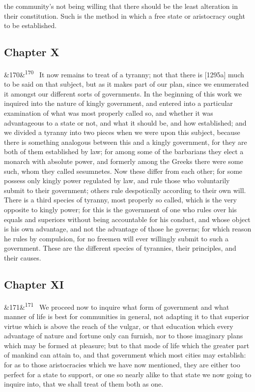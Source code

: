 \documentclass[12pt]{article}
\newcommand{\para}[1][]{\par\noindent\ifx&#1&\else\textsuperscript{\footnotesize #1}~\fi}
\begin{document}
the community's not being willing that there should be the least alteration in their constitution. Such is the method in which a free state or aristocracy ought to be established.

\subsection*{Chapter X}

\para[170] It now remains to treat of a tyranny; not that there is [1295a] much to be said on that subject, but as it makes part of our plan, since we enumerated it amongst our different sorts of governments. In the beginning of this work we inquired into the nature of kingly government, and entered into a particular examination of what was most properly called so, and whether it was advantageous to a state or not, and what it should be, and how established; and we divided a tyranny into two pieces when we were upon this subject, because there is something analogous between this and a kingly government, for they are both of them established by law; for among some of the barbarians they elect a monarch with absolute power, and formerly among the Greeks there were some such, whom they called sesumnetes. Now these differ from each other; for some possess only kingly power regulated by law, and rule those who voluntarily submit to their government; others rule despotically according to their own will. There is a third species of tyranny, most properly so called, which is the very opposite to kingly power; for this is the government of one who rules over his equals and superiors without being accountable for his conduct, and whose object is his own advantage, and not the advantage of those he governs; for which reason he rules by compulsion, for no freemen will ever willingly submit to such a government. These are the different species of tyrannies, their principles, and their causes.

\subsection*{Chapter XI}

\para[171] We proceed now to inquire what form of government and what manner of life is best for communities in general, not adapting it to that superior virtue which is above the reach of the vulgar, or that education which every advantage of nature and fortune only can furnish, nor to those imaginary plans which may be formed at pleasure; but to that mode of life which the greater part of mankind can attain to, and that government which most cities may establish: for as to those aristocracies which we have now mentioned, they are either too perfect for a state to support, or one so nearly alike to that state we now going to inquire into, that we shall treat of them both as one.
\end{document}
